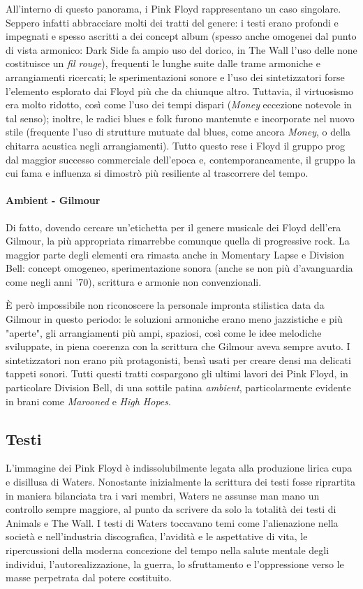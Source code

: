 \documentclass[class=book, crop=false, oneside, 12pt]{standalone}
\begin{document}
    All'interno di questo panorama, i Pink Floyd rappresentano un caso singolare. Seppero infatti abbracciare molti dei tratti del genere: i testi erano profondi e impegnati e spesso ascritti a dei concept album (spesso anche omogenei dal punto di vista armonico: Dark Side fa ampio uso del dorico, in The Wall l'uso delle none costituisce un \emph{fil rouge}), frequenti le lunghe suite dalle trame armoniche e arrangiamenti ricercati; le sperimentazioni sonore e l'uso dei sintetizzatori forse l'elemento esplorato dai Floyd più che da chiunque altro. Tuttavia, il virtuosismo era molto ridotto, così come l'uso dei tempi dispari (\emph{Money} eccezione notevole in tal senso); inoltre, le radici blues e folk furono mantenute e incorporate nel nuovo stile (frequente l'uso di strutture mutuate dal blues, come ancora \emph{Money}, o della chitarra acustica negli arrangiamenti). Tutto questo rese i Floyd il gruppo prog dal maggior successo commerciale dell'epoca e, contemporaneamente, il gruppo la cui fama e influenza si dimostrò più resiliente al trascorrere del tempo.

    \paragraph{Ambient - Gilmour}
    Di fatto, dovendo cercare un'etichetta per il genere musicale dei Floyd dell'era Gilmour, la più appropriata rimarrebbe comunque quella di progressive rock. La maggior parte degli elementi era rimasta anche in Momentary Lapse e Division Bell: concept omogeneo, sperimentazione sonora (anche se non più d'avanguardia come negli anni '70), scrittura e armonie non convenzionali. 

    È però impossibile non riconoscere la personale impronta stilistica data da Gilmour in questo periodo: le soluzioni armoniche erano meno jazzistiche e più "aperte", gli arrangiamenti più ampi, spaziosi, così come le idee melodiche sviluppate, in piena coerenza con la scrittura che Gilmour aveva sempre avuto. I sintetizzatori non erano più protagonisti, bensì usati per creare densi ma delicati tappeti sonori. Tutti questi tratti cospargono gli ultimi lavori dei Pink Floyd, in particolare Division Bell, di una sottile patina \emph{ambient}, particolarmente evidente in brani come \emph{Marooned} e \emph{High Hopes}.

    \subsection{Testi}
    L'immagine dei Pink Floyd è indissolubilmente legata alla produzione lirica cupa e disillusa di Waters. Nonostante inizialmente la scrittura dei testi fosse riprartita in maniera bilanciata tra i vari membri, Waters ne assunse man mano un controllo sempre maggiore, al punto da scrivere da solo la totalità dei testi  di Animals e The Wall. I testi di Waters toccavano temi come l'alienazione nella società e nell'industria discografica, l'avidità e le aspettative di vita, le ripercussioni della moderna concezione del tempo nella salute mentale degli individui, l'autorealizzazione, la guerra, lo sfruttamento e l'oppressione verso le masse perpetrata dal potere costituito. 
\end{document}
